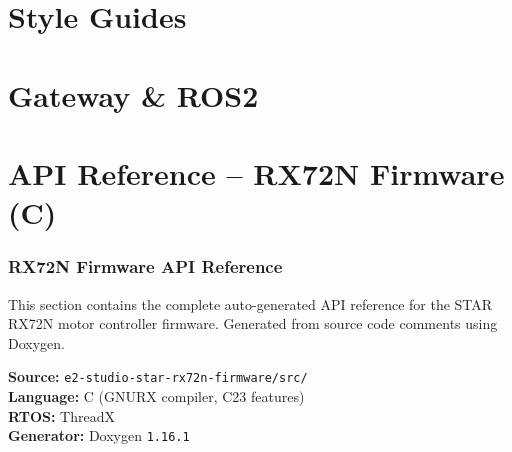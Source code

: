 \documentclass[11pt,letterpaper]{article}
\begin{document}


\part{Style Guides}









\part{Gateway \& ROS2}





\part{API Reference -- RX72N Firmware (C)}

\newpage
\section*{RX72N Firmware API Reference}

This section contains the complete auto-generated API reference for the
STAR RX72N motor controller firmware. Generated from source code comments
using Doxygen.

\vspace{1em}
\noindent\textbf{Source:} \texttt{e2-studio-star-rx72n-firmware/src/}\\
\textbf{Language:} C (GNURX compiler, C23 features)\\
\textbf{RTOS:} ThreadX\\
\textbf{Generator:} Doxygen \texttt{1.16.1}
\end{document}
